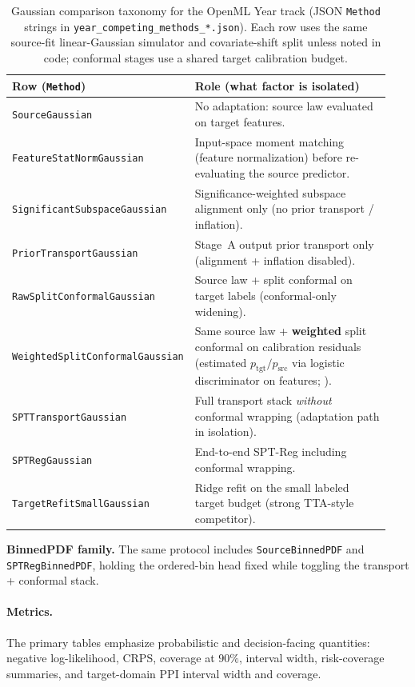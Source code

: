 \documentclass{article}
\begin{document}
\begin{table}[t]
  \caption{Gaussian comparison taxonomy for the OpenML Year track (JSON
  \texttt{Method} strings in \texttt{year\_competing\_methods\_*.json}). Each
  row uses the same source-fit linear-Gaussian simulator and covariate-shift
  split unless noted in code; conformal stages use a shared target calibration
  budget.}
  \label{tab:spt_baseline_map}
  \centering
  \footnotesize
  \begin{tabular}{@{}p{0.26\linewidth}p{0.68\linewidth}@{}}
    \toprule
    Row (\texttt{Method}) & Role (what factor is isolated) \\
    \midrule
    \texttt{SourceGaussian} & No adaptation: source law evaluated on target features. \\
    \texttt{FeatureStatNormGaussian} & Input-space moment matching (feature normalization) before re-evaluating the source predictor. \\
    \texttt{SignificantSubspaceGaussian} & Significance-weighted subspace alignment only (no prior transport / inflation). \\
    \texttt{PriorTransportGaussian} & Stage~A output prior transport only (alignment + inflation disabled). \\
    \texttt{RawSplitConformalGaussian} & Source law + split conformal on target labels (conformal-only widening). \\
    \texttt{WeightedSplitConformalGaussian} & Same source law + \textbf{weighted} split conformal on calibration residuals (estimated $p_{\mathrm{tgt}}/p_{\mathrm{src}}$ via logistic discriminator on features; \citealp{tibshirani2019conformal}). \\
    \texttt{SPTTransportGaussian} & Full transport stack \emph{without} conformal wrapping (adaptation path in isolation). \\
    \texttt{SPTRegGaussian} & End-to-end SPT-Reg including conformal wrapping. \\
    \texttt{TargetRefitSmallGaussian} & Ridge refit on the small labeled target budget (strong TTA-style competitor). \\
    \bottomrule
  \end{tabular}
\end{table}

\noindent\textbf{BinnedPDF family.} The same protocol includes
\texttt{SourceBinnedPDF} and \texttt{SPTRegBinnedPDF}, holding the ordered-bin
head fixed while toggling the transport + conformal stack.

\paragraph{Metrics.}
The primary tables emphasize probabilistic and decision-facing quantities:
negative log-likelihood, CRPS, coverage at $90\%$, interval width,
risk-coverage summaries, and target-domain PPI interval width and coverage.
\end{document}

